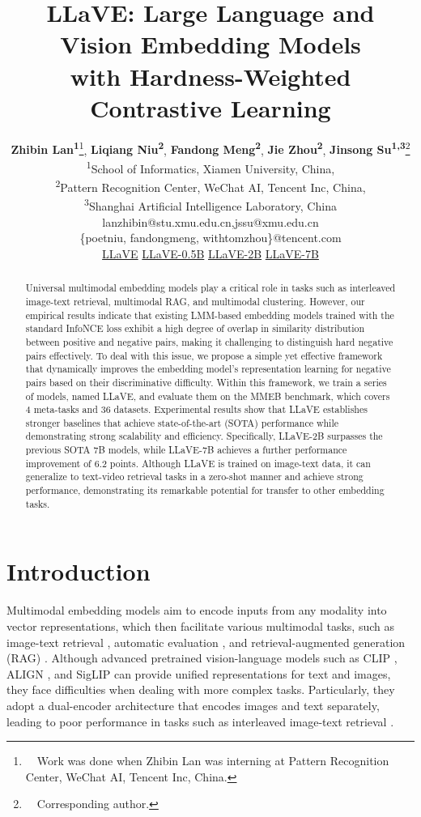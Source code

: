 \documentclass[11pt]{article}
\title{LLaVE: Large Language and Vision Embedding Models \\ with Hardness-Weighted Contrastive Learning}
\author{
 \textbf{Zhibin Lan\textsuperscript{1}}\thanks{~~Work was done when Zhibin Lan was interning at Pattern Recognition Center, WeChat AI, Tencent Inc, China.},\quad
 \textbf{Liqiang Niu\textsuperscript{2}},\quad
 \textbf{Fandong Meng\textsuperscript{2}},\quad
 \textbf{Jie Zhou\textsuperscript{2}},\quad
 \textbf{Jinsong Su\textsuperscript{1,3}}\thanks{~~Corresponding author.}
\\
 \textsuperscript{1}School of Informatics, Xiamen University, China,\\
 \textsuperscript{2}Pattern Recognition Center, WeChat AI, Tencent Inc, China, \\
  \textsuperscript{3}Shanghai Artificial Intelligence Laboratory, China \\
 \small{
   {lanzhibin@stu.xmu.edu.cn,\quad jssu@xmu.edu.cn}
 }\\
 \small{
 {\{poetniu, fandongmeng, withtomzhou\}@tencent.com}
 }\\
 \small{
 \github \enspace \href{https://github.com/DeepLearnXMU/LLaVE}{LLaVE} \quad \huggingface \enspace \href{https://huggingface.co/zhibinlan/LLaVE-0.5B}{LLaVE-0.5B} \quad 
 \huggingface \enspace \href{https://huggingface.co/zhibinlan/LLaVE-2B}{LLaVE-2B} \quad 
 \huggingface \enspace \href{https://huggingface.co/zhibinlan/LLaVE-7B}{LLaVE-7B}
 }
}
\begin{document}
\maketitle
\begin{abstract}
Universal multimodal embedding models play a critical role in tasks such as interleaved image-text retrieval, multimodal RAG, and multimodal clustering. However, our empirical results indicate that existing LMM-based embedding models trained with the standard InfoNCE loss exhibit a high degree of overlap in similarity distribution between positive and negative pairs, making it challenging to distinguish hard negative pairs effectively. To deal with this issue, we propose a simple yet effective framework that dynamically improves the embedding model's representation learning for negative pairs based on their discriminative difficulty. Within this framework, we train a series of models, named LLaVE, and evaluate them on the MMEB benchmark, which covers 4 meta-tasks and 36 datasets. Experimental results show that LLaVE establishes stronger baselines that achieve state-of-the-art (SOTA) performance while demonstrating strong scalability and efficiency. Specifically, LLaVE-2B surpasses the previous SOTA 7B models, while LLaVE-7B achieves a further performance improvement of 6.2 points. Although LLaVE is trained on image-text data, it can generalize to text-video retrieval tasks in a zero-shot manner and achieve strong performance, demonstrating its remarkable potential for transfer to other embedding tasks.
\end{abstract}

\section{Introduction}
Multimodal embedding models aim to encode inputs from any modality into vector representations, which then facilitate various multimodal tasks, such as image-text retrieval \cite{DBLP:conf/cvpr/WuGGARGF21,DBLP:conf/icml/0033LHLQC0C24}, automatic evaluation \cite{clipscore}, and retrieval-augmented generation (RAG) \cite{DBLP:conf/emnlp/ZhaoCWJLQDGLLJ23}. Although advanced pretrained vision-language models such as CLIP \cite{CLIP}, ALIGN \cite{ALIGN}, and SigLIP \cite{SigLIP} can provide unified representations for text and images, they face difficulties when dealing with more complex tasks. Particularly, they adopt a dual-encoder architecture that encodes images and text separately, leading to poor performance in tasks such as interleaved image-text retrieval \cite{DBLP:conf/cvpr/WuGGARGF21}.
\end{document}
